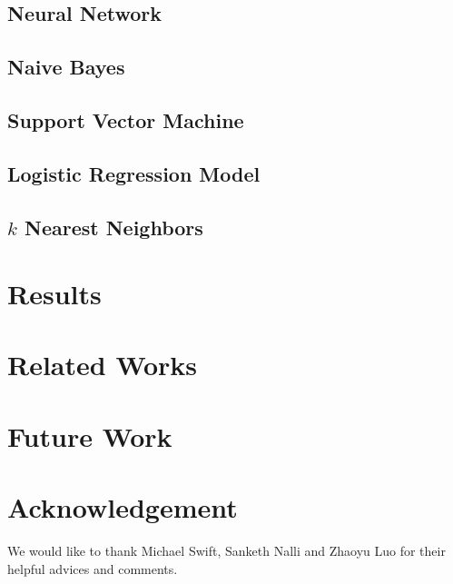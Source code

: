 \documentclass[letterpaper,11pt,twocolumn]{article}
\begin{document}
\subsection{Neural Network}
\subsection{Naive Bayes}
\subsection{Support Vector Machine}
\subsection{Logistic Regression Model}
\subsection{$k$ Nearest Neighbors}


\section{Results}
\label{sec:eval}



\section{Related Works}
\label{sec:related}
\section{Future Work}
\label{sec:future}

\section{Acknowledgement}
We would like to thank Michael Swift, Sanketh Nalli and Zhaoyu Luo for their helpful advices and comments. 



% 


\end{document}
